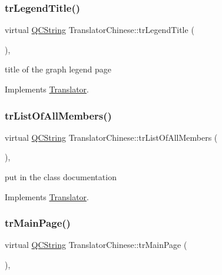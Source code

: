 \subsubsection{\texorpdfstring{trLegendTitle()}{trLegendTitle()}}
{\footnotesize\ttfamily virtual \mbox{\hyperlink{class_q_c_string}{Q\+C\+String}} Translator\+Chinese\+::tr\+Legend\+Title (\begin{DoxyParamCaption}{ }\end{DoxyParamCaption})\hspace{0.3cm}{\ttfamily [inline]}, {\ttfamily [virtual]}}

title of the graph legend page 

Implements \mbox{\hyperlink{class_translator}{Translator}}.

\mbox{\label{class_translator_chinese_af2ff6462a0490ba6985a1e36db2a2610}} 
\subsubsection{\texorpdfstring{trListOfAllMembers()}{trListOfAllMembers()}}
{\footnotesize\ttfamily virtual \mbox{\hyperlink{class_q_c_string}{Q\+C\+String}} Translator\+Chinese\+::tr\+List\+Of\+All\+Members (\begin{DoxyParamCaption}{ }\end{DoxyParamCaption})\hspace{0.3cm}{\ttfamily [inline]}, {\ttfamily [virtual]}}

put in the class documentation 

Implements \mbox{\hyperlink{class_translator}{Translator}}.

\mbox{\label{class_translator_chinese_a7709577f55e8be82e3a69411b9e17105}} 
\subsubsection{\texorpdfstring{trMainPage()}{trMainPage()}}
{\footnotesize\ttfamily virtual \mbox{\hyperlink{class_q_c_string}{Q\+C\+String}} Translator\+Chinese\+::tr\+Main\+Page (\begin{DoxyParamCaption}{ }\end{DoxyParamCaption})\hspace{0.3cm}{\ttfamily [inline]}, {\ttfamily [virtual]}}

